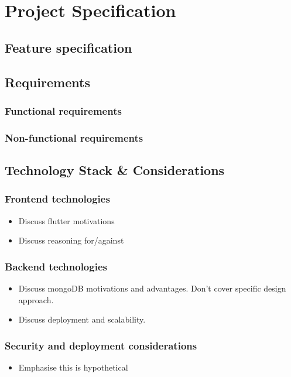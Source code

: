 \chapter{Project Specification}
\label{chap:project-specification}

\section{Feature specification}

\section{Requirements}
\label{sec:requirements}
\subsection{Functional requirements}
\subsection{Non-functional requirements}

\section{Technology Stack \& Considerations}
\subsection{Frontend technologies}
\begin{itemize}[noitemsep]
    \item Discuss flutter motivations
    \item Discuss reasoning for/against
\end{itemize}
\subsection{Backend technologies}
\begin{itemize}[noitemsep]
    \item Discuss mongoDB motivations and advantages. Don't cover
    specific design approach.
    \item Discuss deployment and scalability.
\end{itemize}
\subsection{Security and deployment considerations}
\begin{itemize}[noitemsep]
    \item Emphasise this is hypothetical
\end{itemize}

